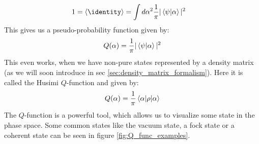 \begin{align*}
    1 = \expval{\identity} &= \int d\alpha^2 \frac{1}{\pi} |\braket{\psi}{\alpha}|^2
\end{align*}
This gives us a pseudo-probability function given by: 
\begin{equation}
    Q(\alpha) = \frac{1}{\pi} |\braket{\psi}{\alpha}|^2
\end{equation}
This even works, when we have non-pure states represented by a density matrix (as we will soon introduce in sec \ref{sec:density_matrix_formalism}). Here it is called the Husimi $Q$-function and given by:
\begin{equation}
    Q(\alpha) =  \frac{1}{\pi} \mel{\alpha}{\rho}{\alpha}
\end{equation}
The $Q$-function is a powerful tool, which allows us to visualize some state in the phase space. Some common states like the vacuum state, a fock state or a coherent state can be seen in figure \ref{fig:Q_func_examples}.

